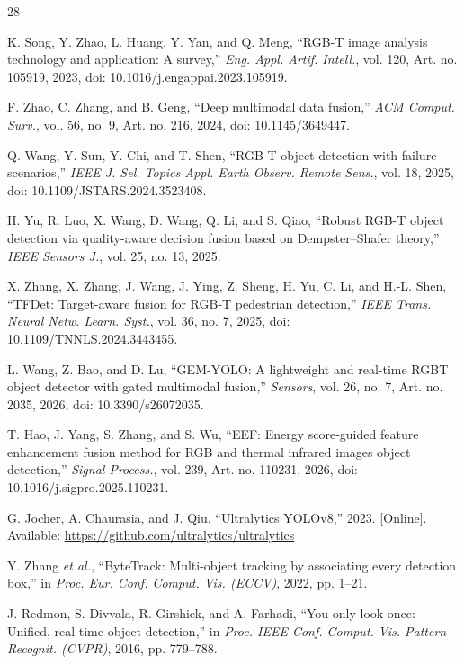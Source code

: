 \documentclass[journal]{IEEEtran}
\begin{document}
\balance
\begin{thebibliography}{28}

K. Song, Y. Zhao, L. Huang, Y. Yan, and Q. Meng, ``RGB-T image analysis technology and application: A survey,'' \emph{Eng. Appl. Artif. Intell.}, vol. 120, Art. no. 105919, 2023, doi: 10.1016/j.engappai.2023.105919.

F. Zhao, C. Zhang, and B. Geng, ``Deep multimodal data fusion,'' \emph{ACM Comput. Surv.}, vol. 56, no. 9, Art. no. 216, 2024, doi: 10.1145/3649447.

Q. Wang, Y. Sun, Y. Chi, and T. Shen, ``RGB-T object detection with failure scenarios,'' \emph{IEEE J. Sel. Topics Appl. Earth Observ. Remote Sens.}, vol. 18, 2025, doi: 10.1109/JSTARS.2024.3523408.

H. Yu, R. Luo, X. Wang, D. Wang, Q. Li, and S. Qiao, ``Robust RGB-T object detection via quality-aware decision fusion based on Dempster--Shafer theory,'' \emph{IEEE Sensors J.}, vol. 25, no. 13, 2025.

X. Zhang, X. Zhang, J. Wang, J. Ying, Z. Sheng, H. Yu, C. Li, and H.-L. Shen, ``TFDet: Target-aware fusion for RGB-T pedestrian detection,'' \emph{IEEE Trans. Neural Netw. Learn. Syst.}, vol. 36, no. 7, 2025, doi: 10.1109/TNNLS.2024.3443455.

L. Wang, Z. Bao, and D. Lu, ``GEM-YOLO: A lightweight and real-time RGBT object detector with gated multimodal fusion,'' \emph{Sensors}, vol. 26, no. 7, Art. no. 2035, 2026, doi: 10.3390/s26072035.

T. Hao, J. Yang, S. Zhang, and S. Wu, ``EEF: Energy score-guided feature enhancement fusion method for RGB and thermal infrared images object detection,'' \emph{Signal Process.}, vol. 239, Art. no. 110231, 2026, doi: 10.1016/j.sigpro.2025.110231.

G. Jocher, A. Chaurasia, and J. Qiu, ``Ultralytics YOLOv8,'' 2023. [Online]. Available: \url{https://github.com/ultralytics/ultralytics}

Y. Zhang \emph{et al.}, ``ByteTrack: Multi-object tracking by associating every detection box,'' in \emph{Proc. Eur. Conf. Comput. Vis. (ECCV)}, 2022, pp. 1--21.

J. Redmon, S. Divvala, R. Girshick, and A. Farhadi, ``You only look once: Unified, real-time object detection,'' in \emph{Proc. IEEE Conf. Comput. Vis. Pattern Recognit. (CVPR)}, 2016, pp. 779--788.


\end{thebibliography}
\end{document}
